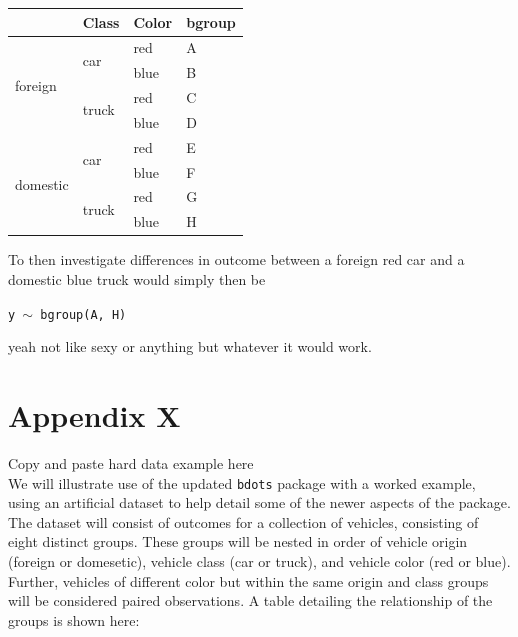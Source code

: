 \documentclass{article}
\newcommand{\xt}{\texttt}%
\begin{document}
\begin{center}

\begin{tabular}{|p{0.9in}|p{0.9in}|p{0.9in}|p{0.5in}|} \hline 
\rowcolor{lightgray} \multicolumn{1}{|c|}{Origin} & \multicolumn{1}{c|}{Class} & \multicolumn{1}{c|}{Color} & \multicolumn{1}{c|}{bgroup}\\
\hline
\multirow{4}{*}{foreign} & \multirow{2}{*}{car} & red & A\\
\hhline{~~--}
& & blue & B \\
\hhline{~---}
& \multirow{2}{*}{truck} & red & C\\
\hhline{~~--}
& & blue & D\\
\hline
\multirow{4}{*}{domestic} & \multirow{2}{*}{car} & red & E \\
\hhline{~~--}
& & blue & F\\
\hhline{~---}
& \multirow{2}{*}{truck} & red & G\\
\hhline{~~--}
& & blue & H\\
\hline
\end{tabular}
\end{center}

To then investigate differences in outcome between a foreign red car and a domestic blue truck would simply then be

\begin{center}
\tt y $\sim$ bgroup(A, H)
\end{center}

yeah not like sexy or anything but whatever it would work.

\section*{Appendix X} Copy and paste hard data example here \\

We will illustrate use of the updated \xt{bdots} package with a worked example, using an artificial dataset to help detail some of the newer aspects of the package. The dataset will consist of outcomes for a collection of vehicles, consisting of eight distinct groups. These groups will be nested in order of vehicle origin (foreign or domesetic), vehicle class (car or truck), and vehicle color (red or blue). Further, vehicles of different color but within the same origin and class groups will be considered paired observations. A table detailing the relationship of the groups is shown here:
\end{document}
